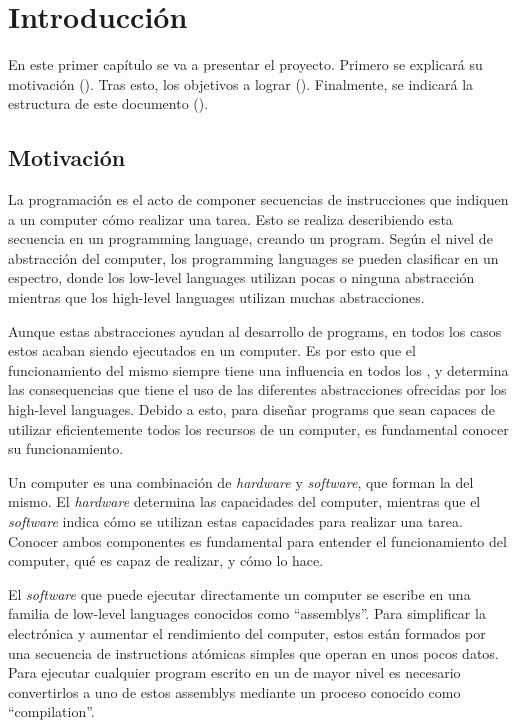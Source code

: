 \chapter{Introducción}\label{chap:introduction}

En este primer capítulo se va a presentar el proyecto. Primero se explicará su
motivación (). Tras esto, los objetivos a
lograr (). Finalmente, se indicará la estructura de este
documento ().

\section{Motivación}\label{sec:motivation}

La programación es el acto de componer secuencias de instrucciones que indiquen
a un \gls{computer} cómo realizar una tarea. Esto se realiza describiendo esta
secuencia en un \gls{programming language}, creando un \gls{program}. Según el
nivel de abstracción del \gls{computer}, los \glspl{programming language} se
pueden clasificar en un espectro, donde los \glspl{low-level language} utilizan
pocas o ninguna abstracción mientras que los \glspl{high-level language}
utilizan muchas abstracciones.

Aunque estas abstracciones ayudan al desarrollo de \glspl{program}, en todos los
casos estos acaban siendo ejecutados en un \gls{computer}. Es por esto que el
funcionamiento del mismo siempre tiene una influencia en todos los
, y determina las consequencias que
tiene el uso de las diferentes abstracciones ofrecidas por los \glspl{high-level
language}. Debido a esto, para diseñar \glspl{program} que sean capaces de
utilizar eficientemente todos los recursos de un \gls{computer}, es fundamental
conocer su funcionamiento.

Un \gls{computer} es una combinación de \textit{hardware} y \textit{software},
que forman la  del mismo. El \textit{hardware}
determina las capacidades del \gls{computer}, mientras que el \textit{software}
indica cómo se utilizan estas capacidades para realizar una tarea. Conocer ambos
componentes es fundamental para entender el funcionamiento del \gls{computer},
qué es capaz de realizar, y cómo lo hace.

El \textit{software} que puede ejecutar directamente un \gls{computer} se
escribe en una familia de \glspl{low-level language} conocidos como
``\glspl{assembly}''. Para simplificar la electrónica y aumentar el rendimiento
del \gls{computer}, estos están formados por una secuencia de
\glspl{instruction} atómicas simples que operan en unos pocos datos. Para
ejecutar cualquier \gls{program} escrito en un  de mayor nivel es necesario convertirlos a uno de estos
\glspl{assembly} mediante un proceso conocido como ``\gls{compilation}''.


